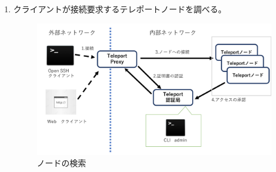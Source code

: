\documentclass[11pt,a4j,titlepage]{jreport}
\begin{document}
\begin{enumerate}[1:]
    
    \item クライアントが接続要求するテレポートノードを調べる。\mbox{}\\
    \begin{figure}[H]
        \centering
        \includegraphics*[width=1.0\textwidth,page=4]{graphs/teleport_archtecture.pdf}
        \caption{ノードの検索}
        \label{search_node}
    \end{figure}


\end{enumerate}
\end{document}
